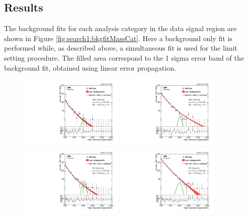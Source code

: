 \clearpage

\subsection{Results}
\label{sec:searchI:results}
The background fits for each analysis category in the data signal region are shown in Figure \ref{fig:search1:bkgfitMassCat}. Here a background only fit is performed while, as described above, a simultaneous fit is used for the limit setting procedure. The filled area correspond to the 1 sigma error band of the background fit, obtained using linear error propagation.

\begin{figure}[h!]
\centering
\includegraphics[width=0.44\textwidth]{figures/analysis/search1/AN-15-211/fits/MLfits/BkgFit_DijetMassHighPuriWW.pdf}
\includegraphics[width=0.44\textwidth]{figures/analysis/search1/AN-15-211/fits/MLfits/BkgFit_DijetMassLowPuriWW.pdf}\\
\includegraphics[width=0.44\textwidth]{figures/analysis/search1/AN-15-211/fits/MLfits/BkgFit_DijetMassHighPuriWZ.pdf}
\includegraphics[width=0.44\textwidth]{figures/analysis/search1/AN-15-211/fits/MLfits/BkgFit_DijetMassLowPuriWZ.pdf}\\

\end{figure}
